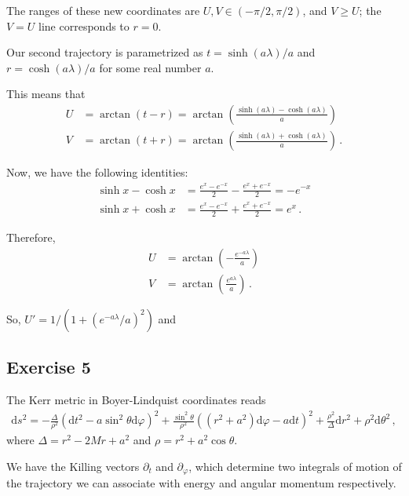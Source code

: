 \documentclass[main.tex]{subfiles}
\begin{document}
The ranges of these new coordinates are \(U, V \in (- \pi /2, \pi /2)\), 
and \(V \geq U\); the \(V = U\) line corresponds to \(r = 0\). 

Our second trajectory is parametrized as \(t = \sinh(a \lambda ) / a\) and \(r = \cosh(a \lambda ) / a\) 
for some real number \(a\).

This means that %
\begin{align}
U &= \arctan(t-r) = \arctan(\frac{\sinh(a \lambda ) - \cosh(a \lambda )}{a})  \\
V &= \arctan(t+r) = \arctan(\frac{\sinh(a \lambda ) + \cosh(a \lambda )}{a})
\,.
\end{align}

Now, we have the following identities: %
\begin{align}
\sinh x - \cosh x &= \frac{e^x - e^{-x}}{2} - \frac{e^x + e^{-x}}{2} = - e^{-x}  \\
\sinh x + \cosh x &= \frac{e^x - e^{-x}}{2} + \frac{e^x + e^{-x}}{2} = e^{x}  
\,.
\end{align}

Therefore, %
\begin{align}
U &= \arctan(- \frac{e^{-a \lambda }}{a}) \\
V &= \arctan(\frac{e^{a \lambda }}{a})
\,.
\end{align}

So, \(U' = 1/(1 + (e^{-a \lambda } / a)^2) \) and 


\subsection{Exercise 5}

The Kerr metric in Boyer-Lindquist coordinates reads %
\begin{align}
\mathrm{d}s^2 = - \frac{\Delta}{\rho^2} 
\left(\mathrm{d}t^2 - a \sin^2 \theta \mathrm{d}\varphi \right)^2
+ \frac{\sin^2 \theta}{\rho^2}
\left( (r^2 + a^2) \mathrm{d}\varphi - a \mathrm{d}t\right)^2
+ \frac{\rho^2}{\Delta } \mathrm{d}r^2 + \rho^2 \mathrm{d}\theta^2
\,,
\end{align}
%
where \(\Delta = r^2 - 2Mr + a^2\) and \(\rho = r^2 + a^2 \cos \theta \).

We have the Killing vectors \(\partial_t\) and \(\partial_\varphi \), which determine two integrals of motion of the trajectory we can associate with energy and angular momentum respectively. 
\end{document}

